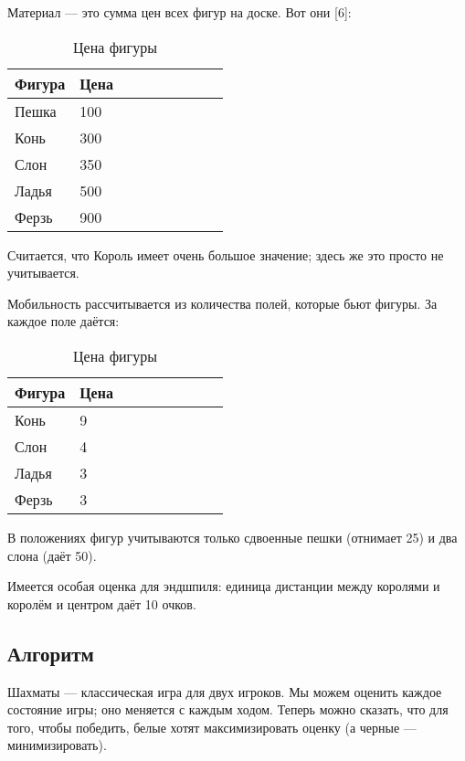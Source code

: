 { 	 Материал --- это сумма цен всех фигур на доске. Вот они [6]:
 	 
 	 	\begin{table}[h]
 	 	\centering
 	 	\caption{Цена фигуры}
 	 	\label{tab: material}
 	 	\begin{tabular}{|l|l|l|l|l|l|l|l|l|}
 	 		\hline
 	 		Фигура & Цена \\ \hline
 	 		Пешка & 100 \\ \hline
 	 		Конь & 300 \\ \hline
 	 		Слон & 350  \\ \hline
 	 		Ладья & 500 \\ \hline
 	 		Ферзь & 900 \\ \hline
 	 		\end{tabular}
  		\end{table}
 		
	Считается, что Король имеет очень большое значение; здесь же это просто не учитывается.
	
	Мобильность рассчитывается из количества полей, которые бьют фигуры. За каждое поле даётся:
	
	\begin{table}[h]
		\centering
		\caption{Цена фигуры}
		\label{tab: mobility}
		\begin{tabular}{|l|l|l|l|l|l|l|l|l|}
			\hline
			Фигура & Цена \\ 
			\hline
			Конь & 9 \\ 
			\hline
			Слон & 4  \\ 
			\hline
			Ладья & 3 \\ 
			\hline
			Ферзь & 3 \\ 
			\hline
		\end{tabular}
	\end{table}

	В положениях фигур учитываются только сдвоенные пешки (отнимает 25) и два слона (даёт 50). 
	
	Имеется особая оценка для эндшпиля: единица дистанции между королями и королём и центром даёт 10 очков.
	
   	\subsection{Алгоритм}
   	
   	Шахматы --- классическая игра для двух игроков. Мы можем оценить каждое состояние игры; оно меняется с каждым ходом. Теперь можно сказать, что для того, чтобы победить, белые хотят максимизировать оценку (а черные --- минимизировать). 
   	
}
